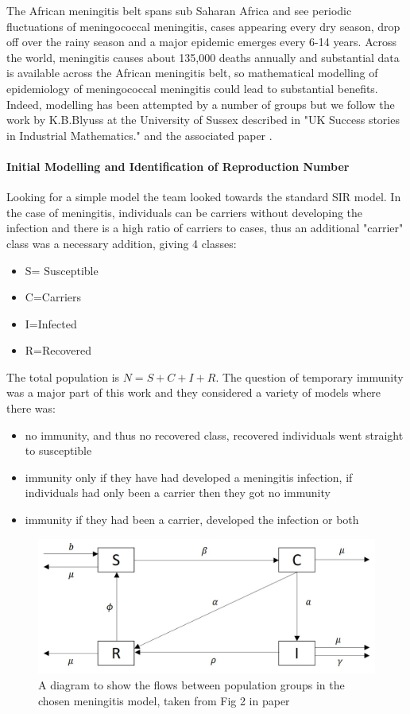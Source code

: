 \documentclass[11pt]{article} %
\begin{document}
The African meningitis belt spans sub Saharan Africa and see periodic fluctuations of meningococcal meningitis, cases appearing every dry season, drop off over the rainy season and a major epidemic emerges every 6-14 years. Across the world, meningitis causes about 135,000 deaths annually and substantial data is available across the African meningitis belt, so mathematical modelling of epidemiology of meningococcal meningitis could lead to substantial benefits. Indeed, modelling has been attempted by a number of groups but we follow the work by K.B.Blyuss at the University of Sussex described in "UK Success stories in Industrial Mathematics." and the associated paper \cite{Irving2012}.


\paragraph{Initial Modelling and Identification of Reproduction Number  }
Looking for a simple model the team looked towards the standard SIR model. In the case of meningitis, individuals can be carriers without developing the infection and there is a high ratio of carriers to cases, thus an additional "carrier" class was a necessary addition, giving 4 classes: 
\begin{itemize}
	\item S= Susceptible
	\item C=Carriers
	\item I=Infected
	\item R=Recovered
\end{itemize}
The total population is $ N=S+C+I+R $. The question of temporary immunity was a major part of this work and they considered a variety of models where there was:
\begin{itemize}
	\item no immunity, and thus no recovered class, recovered individuals went straight  to susceptible 
	\item   immunity only if they have had developed a meningitis infection, if individuals had only been a carrier then they got no immunity
	\item immunity if they had been a carrier, developed the infection or both
\end{itemize}

\begin{figure}
	\centering
	\includegraphics[width=0.9\linewidth]{Report_images/meningitis_model}
	\caption{A diagram to show the flows between population groups in the chosen meningitis model, taken from Fig 2 in paper  \cite{Irving2012}}
	\label{fig:meningitismodel}
\end{figure}
\end{document}

